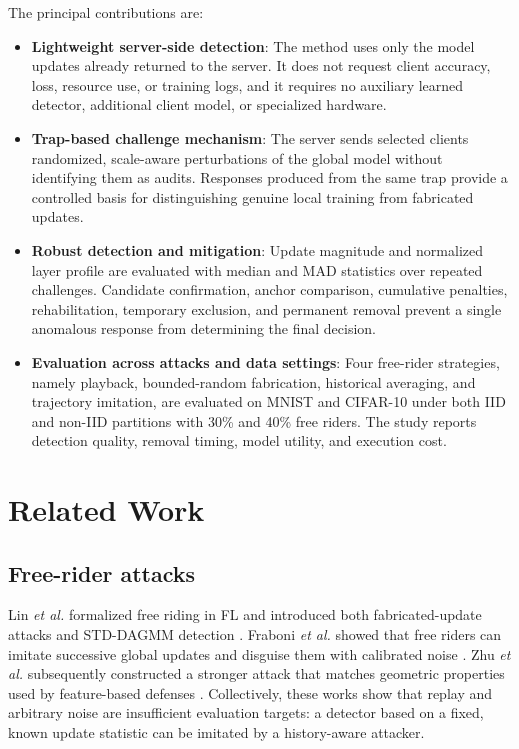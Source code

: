 \documentclass[conference]{IEEEtran}
\begin{document}
The principal contributions are:
\begin{itemize}[leftmargin=*,nosep]
    \item \textbf{Lightweight server-side detection}: The method uses only the model updates already returned to the server. It does not request client accuracy, loss, resource use, or training logs, and it requires no auxiliary learned detector, additional client model, or specialized hardware.
    \item \textbf{Trap-based challenge mechanism}: The server sends selected clients randomized, scale-aware perturbations of the global model without identifying them as audits. Responses produced from the same trap provide a controlled basis for distinguishing genuine local training from fabricated updates.
    \item \textbf{Robust detection and mitigation}: Update magnitude and normalized layer profile are evaluated with median and MAD statistics over repeated challenges. Candidate confirmation, anchor comparison, cumulative penalties, rehabilitation, temporary exclusion, and permanent removal prevent a single anomalous response from determining the final decision.
    \item \textbf{Evaluation across attacks and data settings}: Four free-rider strategies, namely playback, bounded-random fabrication, historical averaging, and trajectory imitation, are evaluated on MNIST and CIFAR-10 under both IID and non-IID partitions with 30\% and 40\% free riders. The study reports detection quality, removal timing, model utility, and execution cost.
\end{itemize}

\section{Related Work}
\subsection{Free-rider attacks}
Lin \emph{et al.} formalized free riding in FL and introduced both fabricated-update attacks and STD-DAGMM detection \cite{lin2019freeriders}. Fraboni \emph{et al.} showed that free riders can imitate successive global updates and disguise them with calibrated noise \cite{fraboni2021freerider}. Zhu \emph{et al.} subsequently constructed a stronger attack that matches geometric properties used by feature-based defenses \cite{zhu2023advanced}. Collectively, these works show that replay and arbitrary noise are insufficient evaluation targets: a detector based on a fixed, known update statistic can be imitated by a history-aware attacker.
\end{document}
